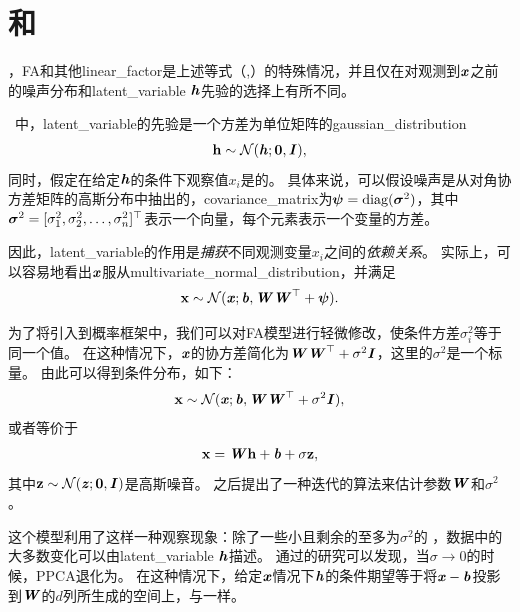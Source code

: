 \section{和}
\label{sec:probabilistic_PCA_and_factor_analysis}

，\gls{FA}和其他\gls{linear_factor}是上述等式（,）的特殊情况，并且仅在对观测到$\boldsymbol{\mathit{x}}$之前的噪声分布和\gls{latent_variable} $\boldsymbol{\mathit{h}}$先验的选择上有所不同。

~\citep{Bartholomew-1987,Basilevsky94}中，\gls{latent_variable}的先验是一个方差为单位矩阵的\gls{gaussian_distribution}
\begin{align}
\label{eqn:133}
\mathbf{h} \sim \mathcal{N}(\boldsymbol{\mathit{h}}; \mathbf{0},\boldsymbol{\mathit{I}}),
\end{align}
同时，假定在给定$\boldsymbol{\mathit{h}}$的条件下观察值$x_i$是的。
具体来说，可以假设噪声是从对角协方差矩阵的高斯分布中抽出的，\gls{covariance_matrix}为$\boldsymbol{\psi} = \text{diag}(\boldsymbol{\sigma}^2)$，其中$\boldsymbol{\sigma}^2 = [\sigma_1^2,\sigma_2^2,\ldots,\sigma_n^2]^{\top}$表示一个向量，每个元素表示一个变量的方差。


因此，\gls{latent_variable}的作用是\emph{捕获}不同观测变量$x_i$之间的\emph{依赖关系}。
实际上，可以容易地看出$\boldsymbol{\mathit{x}}$服从\gls{multivariate_normal_distribution}，并满足
\begin{align}
\label{eqn:134}
\mathbf{x} \sim \mathcal{N}(\boldsymbol{\mathit{x}}; \boldsymbol{\mathit{b}}, \boldsymbol{\mathit{W}}\boldsymbol{\mathit{W}}^{\top}+\boldsymbol{\psi}).
\end{align}



为了将引入到概率框架中，我们可以对\gls{FA}模型进行轻微修改，使条件方差$\sigma_i^2$等于同一个值。
在这种情况下，$\boldsymbol{\mathit{x}}$的协方差简化为$\boldsymbol{\mathit{W}}\boldsymbol{\mathit{W}}^{\top}+\sigma^2\boldsymbol{\mathit{I}}$，这里的$\sigma^2$是一个标量。
由此可以得到条件分布，如下：
\begin{align}
\label{eqn:135}
\mathbf{x} \sim \mathcal{N}(\boldsymbol{\mathit{x}}; \boldsymbol{\mathit{b}}, \boldsymbol{\mathit{W}}\boldsymbol{\mathit{W}}^{\top} + \sigma^2\boldsymbol{\mathit{I}} ),
\end{align}
或者等价于
\begin{align}
\label{eqn:136}
\mathbf{x} = \boldsymbol{\mathit{W}}\mathbf{h} + \boldsymbol{\mathit{b}} + \sigma\mathbf{z},
\end{align}
其中$\mathbf{z} \sim \mathcal{N}(\boldsymbol{\mathit{z}};\mathbf{0},\boldsymbol{\mathit{I}})$是高斯噪音。
之后\citet{tipping99mixtures}提出了一种迭代的算法来估计参数$\boldsymbol{\mathit{W}}$和$\sigma^2$。


这个模型利用了这样一种观察现象：除了一些小且剩余的至多为$\sigma^2$的 ，数据中的大多数变化可以由\gls{latent_variable} $\boldsymbol{\mathit{h}}$描述。
通过\citet{tipping99mixtures}的研究可以发现，当$\sigma \xrightarrow{} 0$的时候，\gls{PPCA}退化为。
在这种情况下，给定$\boldsymbol{\mathit{x}}$情况下$\boldsymbol{\mathit{h}}$的条件期望等于将$\boldsymbol{\mathit{x}} - \boldsymbol{\mathit{b}}$投影到$\boldsymbol{\mathit{W}}$的$d$列所生成的空间上，与一样。

